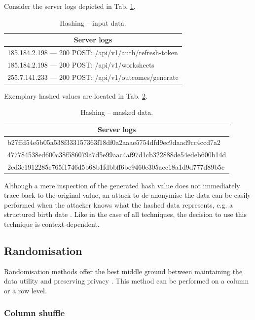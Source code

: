 \documentclass[a4paper,twoside,12pt]{book}
\begin{document}
Consider the server logs depicted in Tab. \ref{id:tab:hashing_raw}.
%
\begin{table}%
\centering
\caption{Hashing – input data.}
\label{id:tab:hashing_raw}
\begin{tabular}{l}
\toprule
\multicolumn{1}{c}{Server logs} \\ \midrule
185.184.2.198 — 200 POST: /api/v1/auth/refresh-token    \\
185.184.2.198 — 200 POST: /api/v1/worksheets \\
255.7.141.233 — 200 POST: /api/v1/outcomes/generate \\ \bottomrule
\end{tabular}
\end{table}
%
Exemplary hashed values are located in Tab. \ref{id:tab:hashing_masked}.
%
\begin{table}%
\centering
\caption{Hashing – masked data.}
\label{id:tab:hashing_masked}
\begin{tabular}{l}
\toprule
\multicolumn{1}{c}{Server logs} \\ \midrule
b27ffd54e5b05a538f333157363f18df0a2aaae5754dfd9ec9daad9cc4ccd7a2 \\
477784538ed600c38f586079a7d5e99aac4af97d1cb322888de54edeb600b14d \\
2cd3e1912285c765f1746d5b68b1fdbbff6be9460e305acc18a1d9d777d89b5e \\ \bottomrule
\end{tabular}
\end{table}

Although a mere inspection of the generated hash value does not immediately trace back to the original value, an attack to de-anonymise the data can be easily performed when the attacker knows what the hashed data represents, e.g. a structured birth date \cite{bib:hash}. Like in the case of all techniques, the decision to use this technique is context-dependent.

\subsection{Randomisation}

Randomisation methods offer the best middle ground between maintaining the data utility and preserving privacy \cite{bib:data_shuffling}. This method can be performed on a column or a row level.

\subsubsection{Column shuffle}
\end{document}
